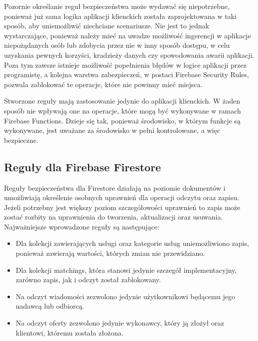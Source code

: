 Pozornie określanie reguł bezpieczeństwa może wydawać się niepotrzebne, ponieważ już sama logika aplikacji klienckich została zaprojektowana w taki sposób, aby uniemożliwić niechciane scenariusze. Nie jest to jednak wystarczające, ponieważ należy mieć na uwadze możliwość ingerencji w aplikacje niepożądanych osób lub zdobycia przez nie w inny sposób dostępu, w celu uzyskania pewnych korzyści, kradzieży danych czy spowodowania awarii aplikacji. Poza tym zawsze istnieje możliwość popełnienia błędów w logice aplikacji przez programistę, a kolejna warstwa zabezpieczeń, w postaci Firebase Security Rules, pozwala zablokować te operacje, które nie powinny mieć miejsca.

Stworzone reguły mają zastosowanie jedynie do aplikacji klienckich. W żaden sposób nie wpływają one na operacje, które mogą być wykonywane w ramach Firebase Functions. Dzieje się tak, ponieważ środowisko, w którym funkcje są wykonywane, jest uważane za środowisko w pełni kontrolowane, a więc bezpieczne.  

\subsection{Reguły dla Firebase Firestore}

Reguły bezpieczeństwa dla Firestore działają na poziomie dokumentów i umożliwiają określenie osobnych uprawnień dla operacji odczytu oraz zapisu. Jeżeli potrzebny jest większy poziom szczegółowości uprawnień to zapis może zostać rozbity na uprawnienia do tworzenia, aktualizacji oraz usuwania. Najważniejsze wprowadzone reguły są następujące:

\begin{itemize}
    \item Dla kolekcji zawierających usługi oraz kategorie usług uniemożliwiono zapis, ponieważ zawierają wartości, których zmian nie przewidziano.
    \item Dla kolekcji matchings, która stanowi jedynie szczegół implementacyjny, zarówno zapis, jak i odczyt został zablokowany.
    \item Na odczyt wiadomości zezwolono jedynie użytkownikowi będącemu jego nadawcą lub odbiorcą.
    \item Na odczyt oferty zezwolono jedynie wykonawcy, który ją złożył oraz klientowi, któremu została złożona.
\end{itemize}


